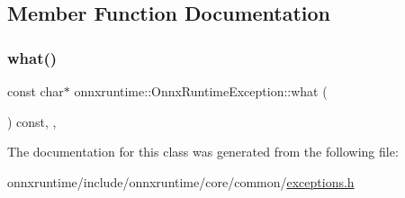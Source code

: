 \subsection{Member Function Documentation}
\mbox{\label{classonnxruntime_1_1OnnxRuntimeException_af476a02759e2cf658cb7af3824f45bcc}} 
\subsubsection{\texorpdfstring{what()}{what()}}
{\footnotesize\ttfamily const char$\ast$ onnxruntime\+::\+Onnx\+Runtime\+Exception\+::what (\begin{DoxyParamCaption}{ }\end{DoxyParamCaption}) const\hspace{0.3cm}{\ttfamily [inline]}, {\ttfamily [override]}, {\ttfamily [noexcept]}}



The documentation for this class was generated from the following file\+:\begin{DoxyCompactItemize}
\item 
onnxruntime/include/onnxruntime/core/common/\mbox{\hyperlink{exceptions_8h}{exceptions.\+h}}\end{DoxyCompactItemize}
